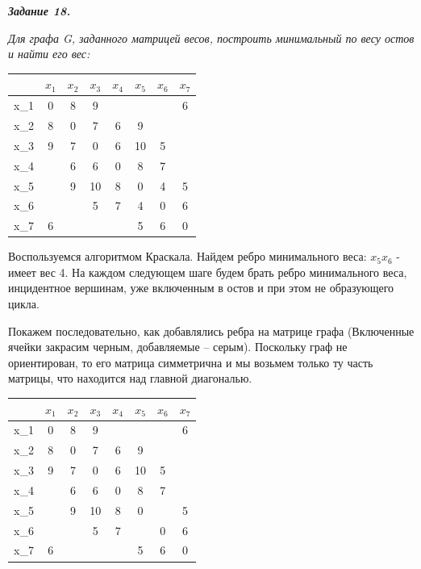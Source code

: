 \documentclass[12pt]{article}
\begin{document}
\textit{\textbf{Задание 18.}}

\textit{Для графа G, заданного матрицей весов, построить минимальный
по весу остов и найти его вес:}

\begin{center}
        \begin{tabular}{ |c|c|c|c|c|c|c|c| }
                \hline
				 & $x_1$ & $x_2$ & $x_3$ & $x_4$ & $x_5$ & $x_6$ & $x_7$\\
                \hline
				x_1 & 0 & 8 & 9 & \infty & \infty & \infty & 6 \\
                \hline
				x_2 & 8 & 0 & 7 & 6 & 9 & \infty & \infty \\
                \hline
				x_3 & 9 & 7 & 0 & 6 & 10 & 5 & \infty \\
                \hline
				x_4 & \infty & 6 & 6 & 0 & 8 & 7 & \infty \\
                \hline
				x_5 & \infty & 9 & 10 & 8 & 0 & 4 & 5\\
                \hline
				x_6 & \infty & \infty & 5 & 7 & 4 & 0 & 6\\
                \hline
				x_7 & 6 & \infty & \infty & \infty & 5 & 6 & 0\\
                \hline
        \end{tabular}
\end{center}

Воспользуемся алгоритмом Краскала. Найдем ребро минимального веса:
$x_5x_6$ - имеет вес 4. На
каждом следующем шаге будем брать ребро минимального веса, инцидентное
вершинам, уже включенным в остов и при этом не образующего цикла.

Покажем последовательно, как добавлялись ребра на матрице графа
(Включенные ячейки закрасим черным, добавляемые – серым). Поскольку граф
не ориентирован, то его матрица симметрична и мы возьмем только ту часть
матрицы, что находится над главной диагональю.

\begin{center}
        \begin{tabular}{ |c|c|c|c|c|c|c|c| }
                \hline
				 & $x_1$ & $x_2$ & $x_3$ & $x_4$ & $x_5$ & $x_6$ & $x_7$\\
                \hline
				x_1 & 0 & 8 & 9 & \infty & \infty & \infty & 6 \\
                \hline
				x_2 & 8 & 0 & 7 & 6 & 9 & \infty & \infty \\
                \hline
				x_3 & 9 & 7 & 0 & 6 & 10 & 5 & \infty \\
                \hline
				x_4 & \infty & 6 & 6 & 0 & 8 & 7 & \infty \\
                \hline
				x_5 & \infty & 9 & 10 & 8 & 0 & \cellcolor{black}\textcolor{white}4 & \cellcolor{gray}5 \\
                \hline
				x_6 & \infty & \infty & 5 & 7 & \cellcolor{black}\textcolor{white}4 & 0 & 6\\
                \hline
				x_7 & 6 & \infty & \infty & \infty & \cellcolor{gray}5 & 6 & 0\\
                \hline
        \end{tabular}
\end{center}
\end{document}
